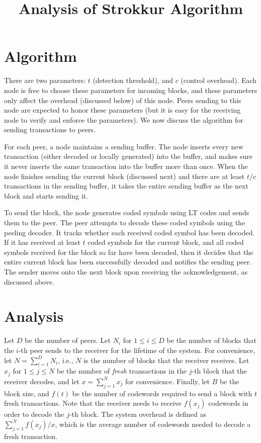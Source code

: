 \documentclass{article}
\title{Analysis of Strokkur Algorithm}
\begin{document}
\maketitle

\section{Algorithm}
 There are two parameters: $t$ (detection threshold), and
$c$ (control overhead). Each node is free to choose these parameters for
incoming blocks, and these parameters only affect the overhead (discussed
below) of this node. Peers sending to this node are expected to honor these
parameters (but it is easy for the receiving node to verify and enforce
the parameters). We now discuss the algorithm for sending transactions to peers.

For each peer, a node maintains a sending buffer. The node inserts every new
transaction (either decoded or locally generated) into the buffer, and makes
sure it never inserts the same transaction into the buffer more than once.
When the node finishes sending the current block (discussed next) and there
are at least $t/c$ transactions in the sending buffer, it takes the entire
sending buffer as the next block and starts sending it.

To send the block, the node generates coded symbols using LT codes and sends
them to the peer. The peer attempts to decode these coded symbols using the
peeling decoder. It tracks whether each received coded symbol has been decoded.
If it has received at least $t$ coded symbols for the current block, and all
coded symbols received for the block so far have been decoded, then it decides
that the entire current block has been successfully decoded and notifies the
sending peer. The sender moves onto the next block upon receiving the
acknowledgement, as discussed above.

\section{Analysis}
Let $D$ be the number of peers. Let $N_i$ for $1 \le i \le D$ be the number of
blocks that the $i$-th peer sends to the receiver for the lifetime of the
system. For convenience, let $N = \sum_{i=1}^D N_i$, i.e., $N$ is the number of
blocks that the receiver receives.  Let $x_j$ for $1 \le j \le N$ be the number
of \emph{fresh} transactions in the $j$-th block that the receiver decodes, and
let $x=\sum_{j=1}^N x_j$ for convenience.  Finally, let $B$ be the block size,
and $f(t)$ be the number of codewords required to send a block with $t$ fresh
transactions. Note that the receiver needs to receive $f(x_j)$ codewords in
order to decode the $j$-th block. The system overhead is defined as
$\sum_{j=1}^N f(x_j)/x$, which is the average number of codewords needed to
decode a fresh transaction.
\end{document}
